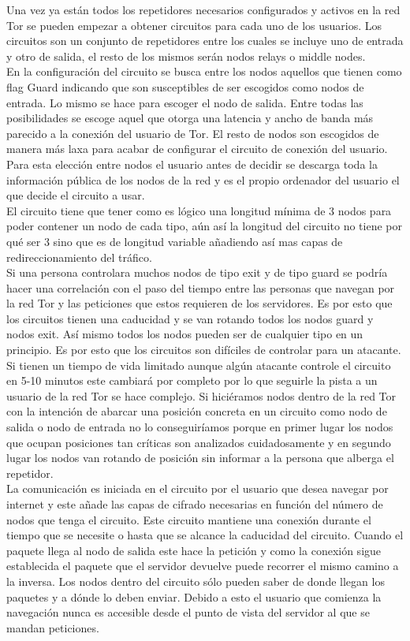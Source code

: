 Una vez ya están todos los repetidores necesarios configurados y activos en la red Tor se pueden empezar a obtener circuitos para cada uno de los usuarios. Los circuitos son un conjunto de repetidores entre los cuales se incluye uno de entrada y otro de salida, el resto de los mismos serán nodos relays o middle nodes.\\
En la configuración del circuito se busca entre los nodos aquellos que tienen como flag Guard indicando que son susceptibles de ser escogidos como nodos de entrada. Lo mismo se hace para escoger el nodo de salida. Entre todas las posibilidades se escoge aquel que otorga una latencia y ancho de banda más parecido a la conexión del usuario de Tor. El resto de nodos son escogidos de manera más laxa para acabar de configurar el circuito de conexión del usuario. Para esta elección entre nodos el usuario antes de decidir se descarga toda la información pública de los nodos de la red y es el propio ordenador del usuario el que decide el circuito a usar.\\
El circuito tiene que tener como es lógico una longitud mínima de 3 nodos para poder contener un nodo de cada tipo, aún así la longitud del circuito no tiene por qué ser 3 sino que es de longitud variable añadiendo así mas capas de redireccionamiento del tráfico.\\
Si una persona controlara muchos nodos de tipo exit y de tipo guard se podría hacer una correlación con el paso del tiempo entre las personas que navegan por la red Tor y las peticiones que estos requieren de los servidores. Es por esto que los circuitos tienen una caducidad y se van rotando todos los nodos guard y nodos exit. Así mismo todos los nodos pueden ser de cualquier tipo en un principio. Es por esto que los circuitos son difíciles de controlar para un atacante. Si tienen un tiempo de vida limitado aunque algún atacante controle el circuito en 5-10 minutos este cambiará por completo por lo que seguirle la pista a un usuario de la red Tor se hace complejo. Si hiciéramos nodos dentro de la red Tor con la intención de abarcar una posición concreta en un circuito como nodo de salida o nodo de entrada no lo conseguiríamos porque en primer lugar los nodos que ocupan posiciones tan críticas son analizados cuidadosamente y en segundo lugar los nodos van rotando de posición sin informar a la persona que alberga el repetidor.\\
La comunicación es iniciada en el circuito por el usuario que desea navegar por internet y este añade las capas de cifrado necesarias en función del número de nodos que tenga el circuito. Este circuito mantiene una conexión durante el tiempo que se necesite o hasta que se alcance la caducidad del circuito. Cuando el paquete llega al nodo de salida este hace la petición y como la conexión sigue establecida el paquete que el servidor devuelve puede recorrer el mismo camino a la inversa. Los nodos dentro del circuito sólo pueden saber de donde llegan los paquetes y a dónde lo deben enviar. Debido a esto el usuario que comienza la navegación nunca es accesible desde el punto de vista del servidor al que se mandan peticiones.